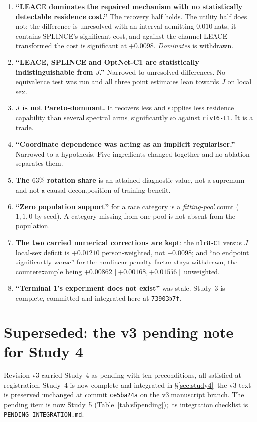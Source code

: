 \documentclass[10pt]{article}
\begin{document}
\begin{enumerate}\itemsep1pt
\item \textbf{``LEACE dominates the repaired mechanism with no statistically detectable residence
cost.''} The recovery half holds. The utility half does not: the difference is unresolved with an
interval admitting $0.010$ nats, it contains SPLINCE's significant cost, and against the channel LEACE
transformed the cost is significant at $+0.0098$. \emph{Dominates} is withdrawn.
\item \textbf{``LEACE, SPLINCE and OptNet-C1 are statistically indistinguishable from $J$.''} Narrowed
to unresolved differences. No equivalence test was run and all three point estimates lean towards $J$
on local sex.
\item \textbf{$J$ is not Pareto-dominant.} It recovers less and supplies less residence capability
than several spectral arms, significantly so against \texttt{riv16-L1}. It is a trade.
\item \textbf{``Coordinate dependence was acting as an implicit regulariser.''} Narrowed to a
hypothesis. Five ingredients changed together and no ablation separates them.
\item \textbf{The $63\%$ rotation share} is an attained diagnostic value, not a supremum and not a
causal decomposition of training benefit.
\item \textbf{``Zero population support''} for a race category is a \emph{fitting-pool} count
($1,1,0$ by seed). A category missing from one pool is not absent from the population.
\item \textbf{The two carried numerical corrections are kept}: the \texttt{nlr8-C1} versus $J$ local-sex
deficit is $+0.01210$ person-weighted, not $+0.0098$; and ``no endpoint significantly worse'' for the
nonlinear-penalty factor stays withdrawn, the counterexample being $+0.00862\,[+0.00168,+0.01556]$
unweighted.
\item \textbf{``Terminal 1's experiment does not exist''} was stale. Study~3 is complete, committed
and integrated here at \texttt{73903b7f}.
\end{enumerate}

\section{Superseded: the v3 pending note for Study 4}
\label{app:pending}
\noindent Revision v3 carried Study~4 as pending with ten preconditions, all satisfied at registration.
Study~4 is now complete and integrated in \S\ref{sec:study4}; the v3 text is preserved unchanged at commit \texttt{ce5ba24a} on the v3 manuscript branch. The pending item is now
Study~5 (Table~\ref{tab:s5pending}); its integration checklist is \texttt{PENDING\_INTEGRATION.md}.


\end{document}
